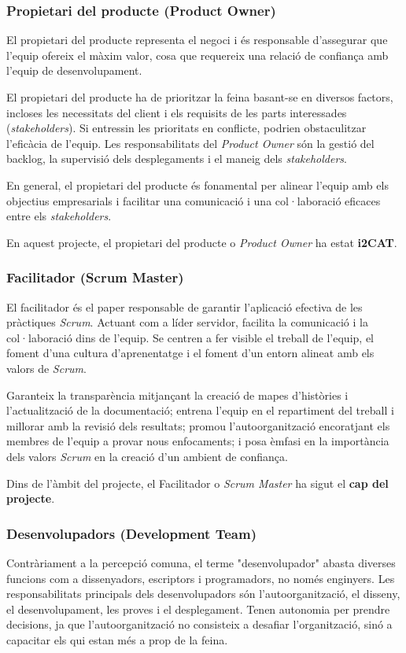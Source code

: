 \subsubsection{Propietari del producte (Product Owner)}
El propietari del producte representa el negoci i és responsable d'assegurar que l'equip ofereix el màxim valor, cosa que requereix una relació de confiança amb l'equip de desenvolupament.

El propietari del producte ha de prioritzar la feina basant-se en diversos factors, incloses les necessitats del client i els requisits de les parts interessades (\textit{stakeholders}). Si entressin les prioritats en conflicte, podrien obstaculitzar l'eficàcia de l'equip. Les responsabilitats del \textit{Product Owner} són la gestió del backlog, la supervisió dels desplegaments i el maneig dels \textit{stakeholders}.

En general, el propietari del producte és fonamental per alinear l'equip amb els objectius empresarials i facilitar una comunicació i una col·laboració eficaces entre els \textit{stakeholders}.

En aquest projecte, el propietari del producte o \textit{Product Owner} ha estat \textbf{i2CAT}.


\subsubsection{Facilitador (Scrum Master)}
El facilitador és el paper responsable de garantir l'aplicació efectiva de les pràctiques \textit{Scrum}. Actuant com a líder servidor, facilita la comunicació i la col·laboració dins de l'equip. Se centren a fer visible el treball de l'equip, el foment d'una cultura d'aprenentatge i el foment d'un entorn alineat amb els valors de \textit{Scrum}.

Garanteix la transparència mitjançant la creació de mapes d'històries i l'actualització de la documentació; entrena l'equip en el repartiment del treball i millorar amb la revisió dels resultats; promou l'autoorganització encoratjant els membres de l'equip a provar nous enfocaments; i posa èmfasi en la importància dels valors \textit{Scrum} en la creació d'un ambient de confiança.

Dins de l'àmbit del projecte, el Facilitador o \textit{Scrum Master} ha sigut el \textbf{cap del projecte}.


\subsubsection{Desenvolupadors (Development Team)}
Contràriament a la percepció comuna, el terme "desenvolupador" abasta diverses funcions com a dissenyadors, escriptors i programadors, no només enginyers. Les responsabilitats principals dels desenvolupadors són l'autoorganització, el disseny, el desenvolupament, les proves i el desplegament. Tenen autonomia per prendre decisions, ja que l'autoorganització no consisteix a desafiar l'organització, sinó a capacitar els qui estan més a prop de la feina. 

